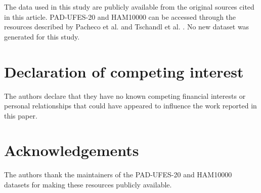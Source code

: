\documentclass[preprint,12pt]{elsarticle}
\begin{document}
The data used in this study are publicly available from the original sources cited in this article. PAD-UFES-20 and HAM10000 can be accessed through the resources described by Pacheco et al. \cite{pacheco2020padufes20} and Tschandl et al. \cite{tschandl2018ham10000}. No new dataset was generated for this study.

\section*{Declaration of competing interest}

The authors declare that they have no known competing financial interests or personal relationships that could have appeared to influence the work reported in this paper.

\section*{Acknowledgements}

The authors thank the maintainers of the PAD-UFES-20 and HAM10000 datasets for making these resources publicly available.



\end{document}

